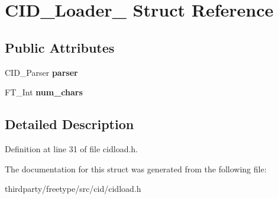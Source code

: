 \hypertarget{struct_c_i_d___loader__}{}\section{C\+I\+D\+\_\+\+Loader\+\_\+ Struct Reference}
\label{struct_c_i_d___loader__}
\subsection*{Public Attributes}
\begin{DoxyCompactItemize}
\item 
\mbox{\label{struct_c_i_d___loader___a0bafc6472ab5a55a7ff6157607acbd92}} 
C\+I\+D\+\_\+\+Parser {\bfseries parser}
\item 
\mbox{\label{struct_c_i_d___loader___a9f72a02ab6f17abb1c9326887bfd67bc}} 
F\+T\+\_\+\+Int {\bfseries num\+\_\+chars}
\end{DoxyCompactItemize}


\subsection{Detailed Description}


Definition at line 31 of file cidload.\+h.



The documentation for this struct was generated from the following file\+:\begin{DoxyCompactItemize}
\item 
thirdparty/freetype/src/cid/cidload.\+h\end{DoxyCompactItemize}
